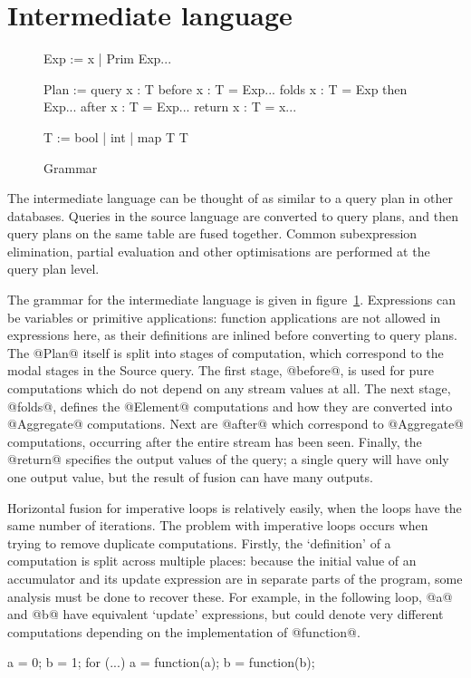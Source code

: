 \section{Intermediate language}
\label{s:IcicleCore}

\begin{figure}

\begin{code}
Exp   := x | Prim Exp...

Plan  := query  x : T
       before { x : T = Exp... }
       folds  { x : T = Exp then Exp... }
       after  { x : T = Exp... }
       return { x : T = x... }

T     := bool | int | map T T
\end{code}


\caption{Grammar}
\label{fig:core:grammar}
\end{figure}

The intermediate language can be thought of as similar to a query plan in other databases.
Queries in the source language are converted to query plans, and then query plans on the same table are fused together.
Common subexpression elimination, partial evaluation and other optimisations are performed at the query plan level.

The grammar for the intermediate language is given in figure~\ref{fig:core:grammar}.
Expressions can be variables or primitive applications: function applications are not allowed in expressions here, as their definitions are inlined before converting to query plans.
The @Plan@ itself is split into stages of computation, which correspond to the modal stages in the Source query.
The first stage, @before@, is used for pure computations which do not depend on any stream values at all.
The next stage, @folds@, defines the @Element@ computations and how they are converted into @Aggregate@ computations.
Next are @after@ which correspond to @Aggregate@ computations, occurring after the entire stream has been seen.
Finally, the @return@ specifies the output values of the query; a single query will have only one output value, but the result of fusion can have many outputs.


Horizontal fusion for imperative loops is relatively easily, when the loops have the same number of iterations.
The problem with imperative loops occurs when trying to remove duplicate computations.
Firstly, the `definition' of a computation is split across multiple places: because the initial value of an accumulator and its update expression are in separate parts of the program, some analysis must be done to recover these.
For example, in the following loop, @a@ and @b@ have equivalent `update' expressions, but could denote very different computations depending on the implementation of @function@.
\begin{code}
a = 0;
b = 1;
for (...) {
  a = function(a);
  b = function(b);
}
\end{code}

